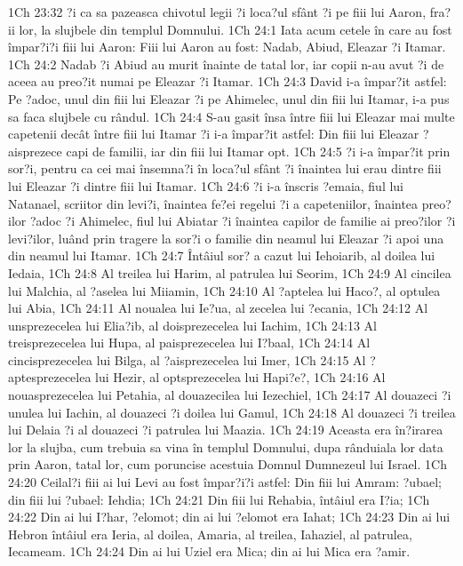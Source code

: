 1Ch 23:32  ?i ca sa pazeasca chivotul legii ?i loca?ul sfânt ?i pe fiii lui Aaron, fra?ii lor, la slujbele din templul Domnului.
1Ch 24:1  Iata acum cetele în care au fost împar?i?i fiii lui Aaron: Fiii lui Aaron au fost: Nadab, Abiud, Eleazar ?i Itamar.
1Ch 24:2  Nadab ?i Abiud au murit înainte de tatal lor, iar copii n-au avut ?i de aceea au preo?it numai pe Eleazar ?i Itamar.
1Ch 24:3  David i-a împar?it astfel: Pe ?adoc, unul din fiii lui Eleazar ?i pe Ahimelec, unul din fiii lui Itamar, i-a pus sa faca slujbele cu rândul.
1Ch 24:4  S-au gasit însa între fiii lui Eleazar mai multe capetenii decât între fiii lui Itamar ?i i-a împar?it astfel: Din fiii lui Eleazar ?aisprezece capi de familii, iar din fiii lui Itamar opt.
1Ch 24:5  ?i i-a împar?it prin sor?i, pentru ca cei mai însemna?i în loca?ul sfânt ?i înaintea lui erau dintre fiii lui Eleazar ?i dintre fiii lui Itamar.
1Ch 24:6  ?i i-a înscris ?emaia, fiul lui Natanael, scriitor din levi?i, înaintea fe?ei regelui ?i a capeteniilor, înaintea preo?ilor ?adoc ?i Ahimelec, fiul lui Abiatar ?i înaintea capilor de familie ai preo?ilor ?i levi?ilor, luând prin tragere la sor?i o familie din neamul lui Eleazar ?i apoi una din neamul lui Itamar.
1Ch 24:7  Întâiul sor? a cazut lui Iehoiarib, al doilea lui Iedaia,
1Ch 24:8  Al treilea lui Harim, al patrulea lui Seorim,
1Ch 24:9  Al cincilea lui Malchia, al ?aselea lui Miiamin,
1Ch 24:10  Al ?aptelea lui Haco?, al optulea lui Abia,
1Ch 24:11  Al noualea lui Ie?ua, al zecelea lui ?ecania,
1Ch 24:12  Al unsprezecelea lui Elia?ib, al doisprezecelea lui Iachim,
1Ch 24:13  Al treisprezecelea lui Hupa, al paisprezecelea lui I?baal,
1Ch 24:14  Al cincisprezecelea lui Bilga, al ?aisprezecelea lui Imer,
1Ch 24:15  Al ?aptesprezecelea lui Hezir, al optsprezecelea lui Hapi?e?,
1Ch 24:16  Al nouasprezecelea lui Petahia, al douazecilea lui Iezechiel,
1Ch 24:17  Al douazeci ?i unulea lui Iachin, al douazeci ?i doilea lui Gamul,
1Ch 24:18  Al douazeci ?i treilea lui Delaia ?i al douazeci ?i patrulea lui Maazia.
1Ch 24:19  Aceasta era în?irarea lor la slujba, cum trebuia sa vina în templul Domnului, dupa rânduiala lor data prin Aaron, tatal lor, cum poruncise acestuia Domnul Dumnezeul lui Israel.
1Ch 24:20  Ceilal?i fiii ai lui Levi au fost împar?i?i astfel: Din fiii lui Amram: ?ubael; din fiii lui ?ubael: Iehdia;
1Ch 24:21  Din fiii lui Rehabia, întâiul era I?ia;
1Ch 24:22  Din ai lui I?har, ?elomot; din ai lui ?elomot era Iahat;
1Ch 24:23  Din ai lui Hebron întâiul era Ieria, al doilea, Amaria, al treilea, Iahaziel, al patrulea, Iecameam.
1Ch 24:24  Din ai lui Uziel era Mica; din ai lui Mica era ?amir.
